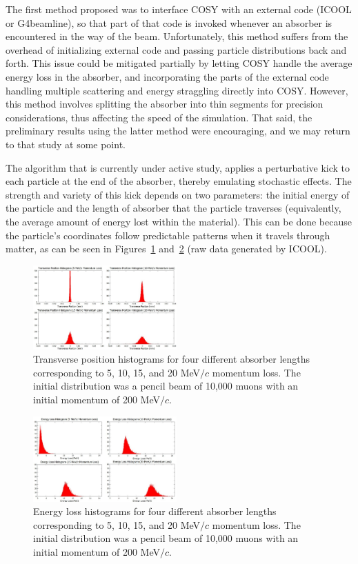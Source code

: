 \documentclass{jacow}
\begin{document}
The first method proposed was to interface COSY with an external code (ICOOL or G4beamline), so that part of that code is invoked whenever an absorber is encountered in the way of the beam. Unfortunately, this method suffers from the overhead of initializing external code and passing particle distributions back and forth. This issue could be mitigated partially by letting COSY handle the average energy loss in the absorber, and incorporating the parts of the external code handling multiple scattering and energy straggling directly into COSY. However, this method involves splitting the absorber into thin segments for precision considerations, thus affecting the speed of the simulation. That said, the preliminary results using the latter method were encouraging, and we may return to that study at some point.

The algorithm that is currently under active study, applies a perturbative kick to each particle at the end of the absorber, thereby emulating stochastic effects. The strength and variety of this kick depends on two parameters: the initial energy of the particle and the length of absorber that the particle traverses (equivalently, the average amount of energy lost within the material). This can be done because the particle's coordinates follow predictable patterns when it travels through matter, as can be seen in Figures~\ref{fig:scattering} and~\ref{fig:straggling} (raw data generated by ICOOL).

\begin{figure}[htb]
\centering
\includegraphics[width=0.49\textwidth]{figures/scattering.jpg}
\caption{Transverse position histograms for four different absorber lengths corresponding to 5, 10, 15, and 20 MeV$/c$ momentum loss. The initial distribution was a pencil beam of 10,000 muons with an initial momentum of 200 MeV$/c$.}
\label{fig:scattering}
\end{figure}

\begin{figure}[htb]
\centering
\includegraphics[width=0.49\textwidth]{figures/straggling.jpg}
\caption{Energy loss histograms for four different absorber lengths corresponding to 5, 10, 15, and 20 MeV$/c$ momentum loss. The initial distribution was a pencil beam of 10,000 muons with an initial momentum of 200 MeV$/c$.}
\label{fig:straggling}
\end{figure}
\end{document}
